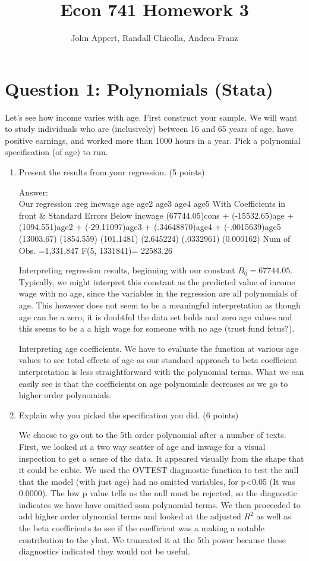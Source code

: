 \documentclass{article}
\begin{document}
\title{Econ 741 Homework 3}
\author{John Appert, Randall Chicolla, Andrea Franz}
\maketitle

\section{Question 1:  Polynomials (Stata)}
Let’s see how income varies with age. First construct your sample. We will want to
study individuals who are (inclusively) between 16 and 65 years of age, have positive earnings, and worked more than 1000 hours in a year. Pick a polynomial specification (of age) to run.

\begin{enumerate}[label=\alph*]
\item Present the results from your regression.  (5 points)

Answer:\\
Our regression :reg incwage age age2 age3 age4 age5
With Coefficients in front & Standard Errors Below
incwage (67744.05)cons + (-15532.65)age + (1094.551)age2 + (-29.11097)age3 + (.34648870)age4 + (-.0015639)age5
        (13003.67)       (1854.559)       (101.1481)       (2.645224)        (.0332961)        (0.000162)
Num of Obs. =1,331,847
F(5, 1331841)= 22583.26


Interpreting regression results, beginning with our constant $B_0 =67744.05$. Typically, we might interpret this constant as the predicted value of income wage with no age, since the variables in the regression are all polynomials of age. This however does not seem to be a meaningful interpretation as though age can be a zero, it is doubtful the data set holds and zero age values and this seems to be a a high wage for someone with no age (trust fund fetus?).
 
Interpreting age coefficients. We have to evaluate the function at various age values to see total effects of age as our standard approach to beta coefficient interpretation is less straightforward with the polynomial terms. What we can easily see is that the coefficients on age polynomials decreases as we go to higher order polynomials. 


\item Explain why you picked the specification you did.  (6 points)

We choose to go out to the 5th order polynomial after a number of texts. First, we looked at a two way scatter of age and inwage for a visual inspection to get a sense of the data. It appeared visually from the shape that it could be cubic. We used the OVTEST diagmostic function to test the null that the model (with just age) had no omitted variables, for p<0.05 (It was 0.0000). The low p value tells us the null must be rejected, so the diagnostic indicates we have have omitted som polynomial terms. We then proceeded to add higher order olynomial terms and looked at the adjusted $R^{2}$ as well as the beta coefficients to see if the coefficient was a making a notable contribution to the yhat. We truncated it at the 5th power because these diagnostics indicated they would not be useful.



\end{enumerate}
\end{document}
